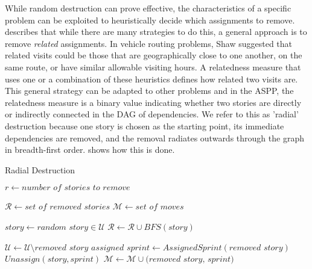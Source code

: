 While random destruction can prove effective, the characteristics of a specific problem can be exploited to heuristically decide which assignments to remove. \citet{shaw1998using} describes that while there are many strategies to do this, a general approach is to remove \textit{related} assignments. In vehicle routing problems, Shaw suggested that related visits could be those that are geographically close to one another, on the same route, or have similar allowable visiting hours. A relatedness measure that uses one or a combination of these heuristics defines how related two visits are. This general strategy can be adapted to other problems and in the ASPP, the relatedness measure is a binary value indicating whether two stories are directly or indirectly connected in the DAG of dependencies. We refer to this as 'radial' destruction because one story is chosen as the starting point, its immediate dependencies are removed, and the removal radiates outwards through the graph in breadth-first order.  shows how this is done.

\begin{algorithm}[H]
\caption{Radial Destruction}\label{radial_destruction}
\begin{algorithmic}[1]
    \State $r \gets \textit{number of stories to remove}$
    
        \State $\mathcal{R} \gets \textit{set of removed stories}$
        \State $\mathcal{M} \gets \textit{set of moves}$
        
            \State $story \gets \textit{random story} \in \mathcal{U}$
            \State $\mathcal{R} \gets \mathcal{R} \cup BFS(story)$
            
                \State $\mathcal{U} \gets \mathcal{U} \setminus \textit{removed story}$
                \State $\textit{assigned sprint} \gets AssignedSprint(\textit{removed story})$
                \State $Unassign(story, sprint)$
                \State $\mathcal{M} \gets \mathcal{M} \cup \textit{(removed story, sprint)}$
            \EndFor
        \EndWhile
        
        \State {}
    \EndProcedure
\end{algorithmic}
\end{algorithm}

